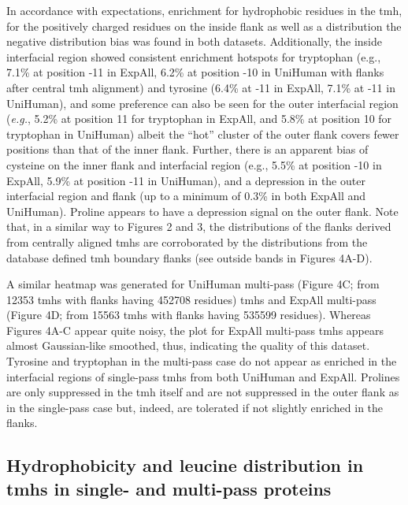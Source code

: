 In accordance with expectations, enrichment for hydrophobic residues in the \gls{tmh}, for the positively charged residues on the inside flank as well as a distribution the negative distribution bias was found in both datasets. Additionally, the inside interfacial region showed consistent enrichment hotspots for tryptophan (e.g., 7.1\% at position -11 in ExpAll, 6.2\% at position -10 in UniHuman with flanks after central \gls{tmh} alignment) and tyrosine (6.4\% at -11 in ExpAll, 7.1\% at -11 in UniHuman), and some preference can also be seen for the outer interfacial region (\textit{e.g.}, 5.2\% at position 11 for tryptophan in ExpAll, and 5.8\% at position 10 for tryptophan in UniHuman) albeit the “hot” cluster of the outer flank covers fewer positions than that of the inner flank. Further, there is an apparent bias of cysteine on the inner flank and interfacial region (e.g., 5.5\% at position -10 in ExpAll, 5.9\% at position -11 in UniHuman), and a depression in the outer interfacial region and flank (up to a minimum of 0.3\% in both ExpAll and UniHuman). Proline appears to have a depression signal on the outer flank. Note that, in a similar way to Figures 2 and 3, the distributions of the flanks derived from centrally aligned \gls{tmh}s are corroborated by the distributions from the database defined \gls{tmh} boundary flanks (see outside bands in Figures 4A-D).

A similar heatmap was generated for UniHuman multi-pass (Figure 4C\@; from 12353 \gls{tmh}s with flanks having 452708 residues) \gls{tmh}s and ExpAll multi-pass (Figure 4D\@; from 15563 \gls{tmh}s with flanks having 535599 residues). Whereas Figures 4A-C appear quite noisy, the plot for ExpAll multi-pass \gls{tmh}s appears almost Gaussian-like smoothed, thus, indicating the quality of this dataset. Tyrosine and tryptophan in the multi-pass case do not appear as enriched in the interfacial regions of single-pass \gls{tmh}s from both UniHuman and ExpAll. Prolines are only suppressed in the \gls{tmh} itself and are not suppressed in the outer flank as in the single-pass case but, indeed, are tolerated if not slightly enriched in the flanks.

\subsection{Hydrophobicity and leucine distribution in \gls{tmh}s in single- and multi-pass proteins}

